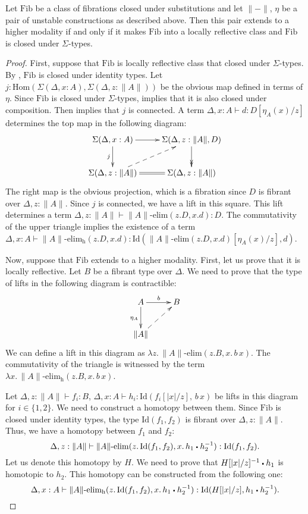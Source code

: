 \documentclass[reqno]{amsart}
\theoremstyle{definition}
\theoremstyle{remark}
\newcommand{\fs}[1]{\mathrm{#1}}
\newcommand{\Hom}{\fs{Hom}}
\newcommand{\Id}{\fs{Id}}
\newcommand{\sym}[1]{#1^{-1}}
\newcommand{\Fib}{\fs{Fib}}
\numberwithin{figure}{section}
\newcommand{\ct}{%
  \mathchoice{\mathbin{\raisebox{0.25ex}{$\displaystyle\centerdot$}}}%
             {\mathbin{\raisebox{0.25ex}{$\centerdot$}}}%
             {\mathbin{\raisebox{0.25ex}{$\scriptstyle\,\centerdot\,$}}}%
             {\mathbin{\raisebox{0.25ex}{$\scriptscriptstyle\,\centerdot\,$}}}
}
\begin{document}
\begin{prop}
Let $\Fib$ be a class of fibrations closed under substitutions and let $\| - \|$, $\eta$ be a pair of unstable constructions as described above.
Then this pair extends to a higher modality if and only if it makes $\Fib$ into a locally reflective class and $\Fib$ is closed under $\Sigma$-types.
\end{prop}
\begin{proof}
First, suppose that $\Fib$ is locally reflective class that closed under $\Sigma$-types.
By , $\Fib$ is closed under identity types.
Let $j : \Hom(\Sigma(\Delta, x : A), \Sigma(\Delta, z : \| A \|))$ be the obvious map defined in terms of $\eta$.
Since $\Fib$ is closed under $\Sigma$-types,  implies that it is also closed under composition.
Then  implies that $j$ is connected.
A term $\Delta, x : A \vdash d : D[\eta_A(x)/z]$ determines the top map in the following diagram:
\[ \xymatrix{ \Sigma(\Delta, x : A) \ar[r] \ar[d]_j                  & \Sigma(\Delta, z : \| A \|, D) \ar@{->>}[d] \\
              \Sigma(\Delta, z : \| A \|) \ar@{-->}[ur] \ar@{=}[r]  & \Sigma(\Delta, z : \| A \|)
            } \]
The right map is the obvious projection, which is a fibration since $D$ is fibrant over $\Delta, z : \| A \|$.
Since $j$ is connected, we have a lift in this square.
This lift determines a term $\Delta, z : \| A \| \vdash \| A \|\text{-}\fs{elim}(z.D, x.d) : D$.
The commutativity of the upper triangle implies the existence of a term $\Delta, x : A \vdash \| A \|\text{-}\fs{elim_h}(z.D, x.d) : \Id(\| A \|\text{-}\fs{elim}(z.D, x.d)[\eta_A(x)/z],d)$.

Now, suppose that $\Fib$ extends to a higher modality.
First, let us prove that it is locally reflective.
Let $B$ be a fibrant type over $\Delta$.
We need to prove that the type of lifts in the following diagram is contractible:
\[ \xymatrix{ A \ar[r]^b \ar[d]_{\eta_A} & B \\
              \| A \| \ar@{-->}[ur]
            } \]
We can define a lift in this diagram as $\lambda z.\,\| A \|\text{-}\fs{elim}(z.B, x.\,b\,x)$.
The commutativity of the triangle is witnessed by the term $\lambda x.\,\| A \|\text{-}\fs{elim_h}(z.B, x.\,b\,x)$.

Let $\Delta, z : \| A \| \vdash f_i : B$, $\Delta, x : A \vdash h_i : \Id(f_i[|x|/z],\,b\,x)$ be lifts in this diagram for $i \in \{1,2\}$.
We need to construct a homotopy between them.
Since $\Fib$ is closed under identity types, the type $\Id(f_1,f_2)$ is fibrant over $\Delta, z : \| A \|$.
Thus, we have a homotopy between $f_1$ and $f_2$:
\[ \Delta, z : \| A \| \vdash \| A \|\text{-}\fs{elim}(z.\,\Id(f_1,f_2), x.\,h_1 \ct \sym{h_2}) : \Id(f_1, f_2). \]
Let us denote this homotopy by $H$.
We need to prove that $\sym{H[|x|/z]} \ct h_1$ is homotopic to $h_2$.
This homotopy can be constructed from the following one:
\[ \Delta, x : A \vdash \| A \|\text{-}\fs{elim_h}(z.\,\Id(f_1,f_2), x.\,h_1 \ct \sym{h_2}) : \Id(H[|x|/z], h_1 \ct \sym{h_2}). \]


\end{proof}
\end{document}

